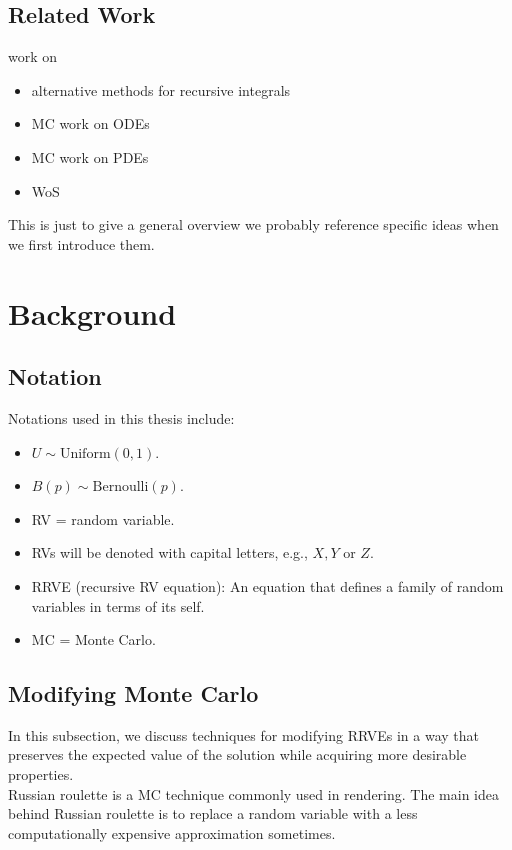 \documentclass[a4paper,12pt]{article}
\begin{document}
\subsection{Related Work}
work on
\begin{itemize}
    \item alternative methods for recursive integrals
    \item MC work on ODEs
    \item MC work on PDEs
    \item WoS
\end{itemize}
This is just to give a general overview we probably reference specific ideas when we first introduce them.

\section{Background}

\subsection{Notation}
Notations used in this thesis include:

\begin{itemize}
    \item $U \sim \text{Uniform}(0,1)$.
    \item $B(p) \sim \text{Bernoulli}(p)$.
    \item RV = random variable.
    \item RVs will be denoted with capital letters, e.g., $X,Y$ or $Z$.
    \item RRVE (recursive RV equation): An equation that defines a
          family of random variables in terms of its self.
    \item MC = Monte Carlo.
\end{itemize}


\subsection{Modifying Monte Carlo}
In this subsection, we discuss techniques for modifying RRVEs
in a way that preserves the expected value of the solution while
acquiring more desirable properties. \\

Russian roulette is a MC technique commonly used in rendering.
The main idea behind Russian roulette is to replace a random variable
with a less computationally expensive approximation sometimes.
\end{document}
